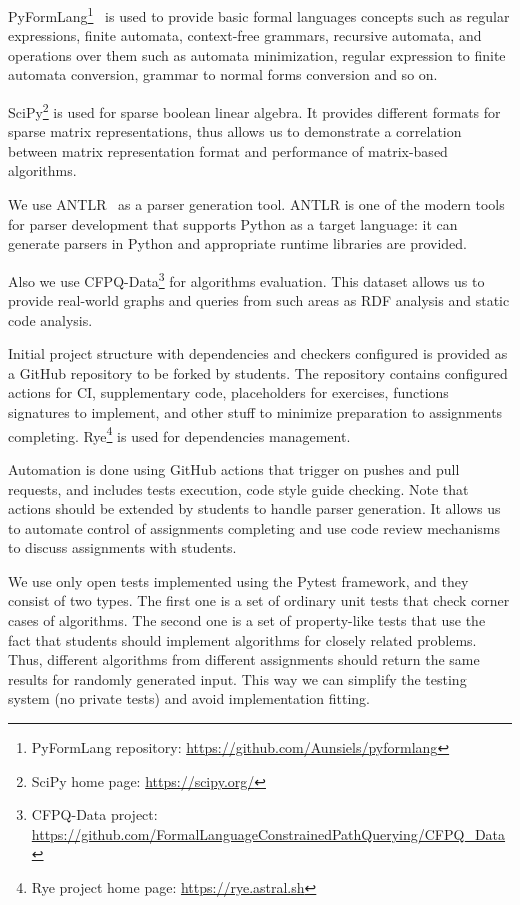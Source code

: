 \documentclass[sigconf]{acmart}
\begin{document}
PyFormLang\footnote{PyFormLang repository: \url{https://github.com/Aunsiels/pyformlang}}~\cite{10.1145/3408877.3432464} is used to provide basic formal languages concepts such as regular expressions, finite automata, context-free grammars, recursive automata, and operations over them such as automata minimization, regular expression to finite automata conversion, grammar to normal forms conversion and so on. 

SciPy\footnote{SciPy home page: \url{https://scipy.org/}} is used for sparse boolean linear algebra.
It provides different formats for sparse matrix representations, thus allows us to demonstrate a correlation between matrix representation format and performance of matrix-based algorithms. 

We use ANTLR~\cite{10.5555/2501720} as a parser generation tool.
ANTLR is one of the modern tools for parser development that supports Python as a target language: it can generate parsers in Python and appropriate runtime libraries are provided.

Also we use CFPQ-Data\footnote{CFPQ-Data project: \url{https://github.com/FormalLanguageConstrainedPathQuerying/CFPQ_Data}} for algorithms evaluation.
This dataset allows us to provide real-world graphs and queries from such areas as RDF analysis and static code analysis. 

Initial project structure with dependencies and checkers configured is provided as a GitHub repository to be forked by students.
The repository contains configured actions for CI, supplementary code, placeholders for exercises, functions signatures to implement, and other stuff to minimize preparation to assignments completing.
Rye\footnote{Rye project home page: \url{https://rye.astral.sh}} is used for dependencies management.

Automation is done using GitHub actions that trigger on pushes and pull requests, and includes tests execution, code style guide checking.
Note that actions should be extended by students to handle parser generation.
It allows us to automate control of assignments completing and use code review mechanisms to discuss assignments with students.

We use only open tests implemented using the Pytest framework, and they consist of two types.
The first one is a set of ordinary unit tests that check corner cases of algorithms.
The second one is a set of property-like tests that use the fact that students should implement algorithms for closely related problems.
Thus, different algorithms from different assignments should return the same results for randomly generated input.
This way we can simplify the testing system (no private tests) and avoid implementation fitting. 
\end{document}

